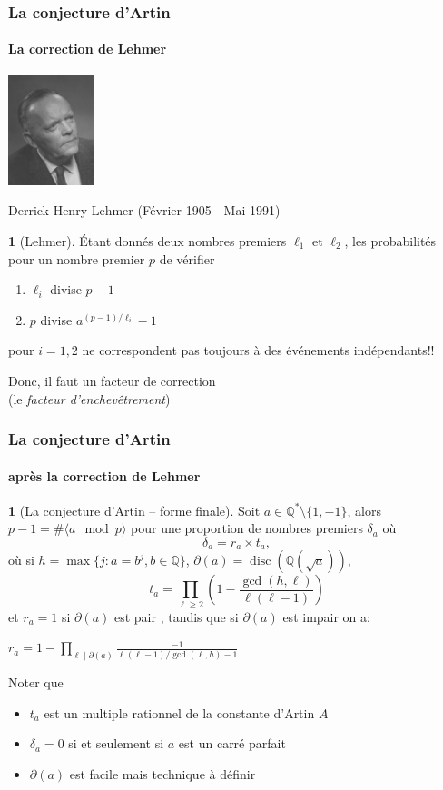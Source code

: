 \documentclass[10pt,handout]{beamer} %
\newcommand{\Q}{\mathbb Q}
\theoremstyle{definition}
\newtheorem{rem}[theorem]{\translate{Remarque}}
\newtheorem{conj}[theorem]{\translate{Conjecture}}
\begin{document}
\begin{frame}\frametitle{La conjecture d'Artin}
\framesubtitle{La correction de Lehmer}

\centerline{\includegraphics[width=2.5cm]{images/Lehmer.jpg}}

\centerline{Derrick Henry Lehmer (F\'evrier 1905 - Mai 1991)}
\pause

\begin{rem}[Lehmer] \'Etant donn\'es deux nombres premiers
$\ell_1$ et $\ell_2$, les probabilit\'es pour un nombre premier $p$
de v\'erifier 
\begin{enumerate}
\item $\ell_i$ divise $p-1$
\item $p$ divise $a^{(p-1)/\ell_i}-1$
\end{enumerate}
pour $i=1,2$ ne correspondent pas toujours \`a des \'ev\'enements  ind\'ependants!!
\end{rem}

Donc, il  faut un facteur de correction\\ \pause
(le \emph{facteur d'enchev\^etrement})
\end{frame}

\begin{frame}\frametitle{La conjecture d'Artin}
\framesubtitle{apr\`es la correction de Lehmer}

\begin{conj}[La conjecture d'Artin -- forme finale] Soit $a\in\Q^*\setminus\{1,-1\}$, alors $p-1=\#\langle a\mod p\rangle$
 pour une proportion de nombres premiers $\delta_a$ o\`u
 $$\delta_a=r_a\times t_a,$$
 o\`u si $h=\max\{j: a=b^j,b\in\Q\}$, $\partial(a)=\operatorname{disc}(\Q(\sqrt{a}))$,
 $$t_a=\prod_{\ell\ge2}\left(1-\frac{\gcd(h,\ell)}{\ell(\ell-1)}\right)$$
 et $r_a=1$ si $\partial(a)$ est pair , tandis que si   $\partial(a)$ est impair on a:\\
\centerline{ $r_a=1-\prod_{\ell\mid \partial(a)}\frac{-1}{\ell(\ell-1)/\gcd(\ell,h)-1}$}
\end{conj}

Noter que
\begin{itemize}[<+-|alert@+>]
\item $t_a$ est un multiple rationnel de la constante d'Artin $A$
\item $\delta_a=0$ si et seulement si $a$ est un carr\'e parfait
\item $\partial(a)$ est facile mais technique \`a d\'efinir
\end{itemize}
\end{frame}
\end{document}

